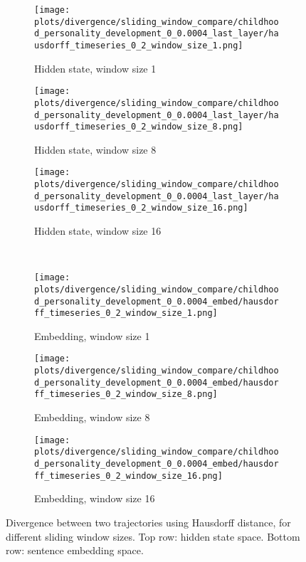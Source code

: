 \documentclass[a4paper,12pt]{article}
\begin{document}
\begin{figure}[H]
    \centering
    \begin{subfigure}[b]{0.32\textwidth}
        \centering
        \texttt{[image: plots/divergence/sliding\_window\_compare/childhood\_personality\_development\_0\_0.0004\_last\_layer/hausdorff\_timeseries\_0\_2\_window\_size\_1.png]}
        \caption{Hidden state, window size 1}
    \end{subfigure}
    \begin{subfigure}[b]{0.32\textwidth}
        \centering
        \texttt{[image: plots/divergence/sliding\_window\_compare/childhood\_personality\_development\_0\_0.0004\_last\_layer/hausdorff\_timeseries\_0\_2\_window\_size\_8.png]}
        \caption{Hidden state, window size 8}
    \end{subfigure}
    \begin{subfigure}[b]{0.32\textwidth}
        \centering
        \texttt{[image: plots/divergence/sliding\_window\_compare/childhood\_personality\_development\_0\_0.0004\_last\_layer/hausdorff\_timeseries\_0\_2\_window\_size\_16.png]}
        \caption{Hidden state, window size 16}
    \end{subfigure}
    \\[0.5em]
    \begin{subfigure}[b]{0.32\textwidth}
        \centering
        \texttt{[image: plots/divergence/sliding\_window\_compare/childhood\_personality\_development\_0\_0.0004\_embed/hausdorff\_timeseries\_0\_2\_window\_size\_1.png]}
        \caption{Embedding, window size 1}
    \end{subfigure}
    \begin{subfigure}[b]{0.32\textwidth}
        \centering
        \texttt{[image: plots/divergence/sliding\_window\_compare/childhood\_personality\_development\_0\_0.0004\_embed/hausdorff\_timeseries\_0\_2\_window\_size\_8.png]}
        \caption{Embedding, window size 8}
    \end{subfigure}
    \begin{subfigure}[b]{0.32\textwidth}
        \centering
        \texttt{[image: plots/divergence/sliding\_window\_compare/childhood\_personality\_development\_0\_0.0004\_embed/hausdorff\_timeseries\_0\_2\_window\_size\_16.png]}
        \caption{Embedding, window size 16}
    \end{subfigure}
    \caption{Divergence between two trajectories using Hausdorff distance, for different sliding window sizes. Top row: hidden state space. Bottom row: sentence embedding space.}
    \label{fig:sliding_window_compare}
\end{figure}
\end{document}

